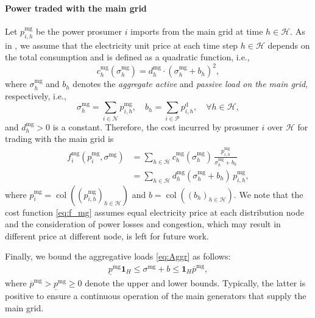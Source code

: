 \documentclass{IEEEtran}  %
\newcommand{\mc}{\mathcal}
\newcommand{\col}{\operatorname{col}}
\newcommand{\0}{\mathbf{0}}
\newcommand{\1}{\mathbf{1}}
\begin{document}
\paragraph*{Power traded with the main grid} Let $p_{i,h}^{\mathrm{mg}}$ be the power prosumer $i$ imports from the main grid at time $h \in \mc H$. As in \cite{atzeni2013}, we assume that the electricity unit price at each time step $h \in \mc H	$ depends on the total consumption and is defined as a quadratic function, i.e.,
\begin{equation}
c_h^{\mathrm{mg}}(\sigma^{\textrm{mg}}_h)= d_h^{\mathrm{mg}}\cdot {\left(\sigma^{\textrm{mg}}_h + b_h \right)}^2,
\end{equation}
where $\sigma^{\textrm{mg}}_h$ and $b_h$ denotes the \textit{aggregate active} and \textit{passive} \textit{load on the main grid}, respectively, i.e., 
\begin{equation} \label{eq:Aggr}
\sigma^{\textrm{mg}}_h = \sum_{i\in\mathcal{N}} p_{i,h}^{\mathrm{mg}},
\quad
b_h =\sum_{i\in \mathcal P}p_{i,h}^{\mathrm{d}},
 \quad \forall h \in \mathcal H,
\end{equation} 
and $d_h^{\mathrm{mg}} > 0$ is a constant.
Therefore, the cost incurred by prosumer $i$ over $\mc H$ for trading with the main grid is
\begin{equation}
\begin{aligned} \textstyle
f_{i}^{\mathrm{mg}}\left( p_{i}^{\mathrm{mg}},\sigma^{\textrm{mg}} \right) &= \sum_{h\in \mc H}c_h^{\mathrm{mg}}(\sigma^{\textrm{mg}}_h) \, \frac{p_{i,h}^{\mathrm{mg}}}{\sigma_h^{\textrm{mg}} + b_h}\\
&= \sum_{h\in \mc H}  d_h^{\mathrm{mg}}(\sigma^{\textrm{mg}}_h+b_h) \, p_{i,h}^{\mathrm{mg}},
\label{eq:f_mg}
\end{aligned}
\end{equation}
where $p_{i}^{\mathrm{mg}} = \col((p_{i,h}^{\mathrm{mg}})_{h\in\mc H})$ and $b =\col((b_h)_{h\in\mc H})$. {We note that the cost function \eqref{eq:f_mg} assumes equal electricity price at each distribution node and the consideration of power losses and congestion, which may result in different price at different node, is left for future work.}  

Finally, we bound the aggregative loads \eqref{eq:Aggr} as follows:
\begin{align}
\underline{p}^{\mathrm{mg}} \1_H \leq \sigma^{\textrm{mg}} + b  \leq \1_H \overline{p}^{\mathrm{mg}}  , \label{eq:p_mg_bound}
\end{align}
where $\overline{p}^{\mathrm{mg}}>\underline{p}^{\mathrm{mg}} \geq 0$ denote the upper and lower bounds. Typically, the latter is  positive to ensure a continuous operation of the main generators that supply the main grid.
\end{document}
